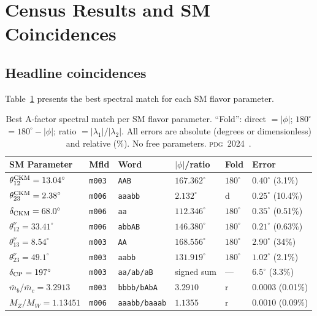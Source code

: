 ﻿\documentclass[aps,prd,twocolumn,longbibliography]{revtex4-2}
\newcommand{\mfld}[1]{\texttt{#1}}
\newcommand{\word}[1]{\texttt{#1}}
\newcommand{\degr}{^{\circ}}
\newcommand{\PDG}{\textsc{pdg}}
\begin{document}
\section{Census Results and SM Coincidences}
\label{sec:results}

\subsection{Headline coincidences}
\label{sec:headline}

Table~\ref{tab:headline} presents the best spectral match for each SM flavor
parameter.

\begin{table}[tp]
\centering
\caption{Best A-factor spectral match per SM flavor parameter.
  ``Fold'': direct $=|\phi|$; $180\degr$$=180\degr-|\phi|$; ratio $=|\lambda_1|/|\lambda_2|$.
  All errors are absolute (degrees or dimensionless) and relative (\%).
  No free parameters. \PDG\ 2024~\cite{PDG2024}.}
\label{tab:headline}
\small
\begin{tabular}{llllll}
\toprule
SM Parameter & Mfld & Word & $|\phi|$/ratio & Fold & Error \\
\midrule
$\theta_{12}^{\rm CKM}=13.04\degr$ & \mfld{m003} & \word{AAB} & $167.362\degr$ & $180\degr$ & $0.40\degr$ (3.1\%) \\
$\theta_{23}^{\rm CKM}=2.38\degr$ & \mfld{m006} & \word{aaabb} & $2.132\degr$ & d & $0.25\degr$ (10.4\%) \\
$\delta_{\rm CKM}=68.0\degr$ & \mfld{m006} & \word{aa} & $112.346\degr$ & $180\degr$ & $0.35\degr$ (0.51\%) \\
$\theta_{12}^\nu=33.41\degr$ & \mfld{m006} & \word{abbAB} & $146.380\degr$ & $180\degr$ & $0.21\degr$ (0.63\%) \\
$\theta_{13}^\nu=8.54\degr$ & \mfld{m003} & \word{AA} & $168.556\degr$ & $180\degr$ & $2.90\degr$ (34\%) \\
$\theta_{23}^\nu=49.1\degr$ & \mfld{m003} & \word{aabb} & $131.919\degr$ & $180\degr$ & $1.02\degr$ (2.1\%) \\
$\delta_{\rm CP}=197\degr$ & \mfld{m003} & \word{aa/ab/aB} & signed sum & --- & $6.5\degr$ (3.3\%) \\
$\bar{m}_b/\bar{m}_c=3.2913$ & \mfld{m003} & \word{bbbb/bAbA} & $3.2910$ & r & $0.0003$ (0.01\%) \\
$M_Z/M_W=1.13451$ & \mfld{m006} & \word{aaabb/baaab} & $1.1355$ & r & $0.0010$ (0.09\%) \\
\bottomrule
\end{tabular}
\end{table}
\end{document}
